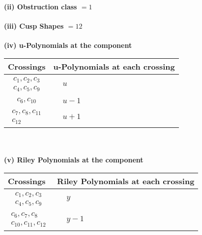 \documentclass[1p]{elsarticle_modified}
\theoremstyle{definition}
\begin{document}
\flushleft \textbf{(ii) Obstruction class $= 1$}\\~\\
\flushleft \textbf{(iii) Cusp Shapes $= 12$}\\~\\
\newpage\renewcommand{\arraystretch}{1}
\flushleft \textbf{(iv) u-Polynomials at the component}\newline \\
\begin{tabular}{m{50pt}|m{274pt}}
Crossings & \hspace{64pt}u-Polynomials at each crossing \\
\hline $$\begin{aligned}c_{1},c_{2},c_{3}\\c_{4},c_{5},c_{9}\end{aligned}$$&$\begin{aligned}
&u
\end{aligned}$\\
\hline $$\begin{aligned}c_{6},c_{10}\end{aligned}$$&$\begin{aligned}
&u-1
\end{aligned}$\\
\hline $$\begin{aligned}c_{7},c_{8},c_{11}\\c_{12}\end{aligned}$$&$\begin{aligned}
&u+1
\end{aligned}$\\
\hline
\end{tabular}\\~\\
\newpage\renewcommand{\arraystretch}{1}
\flushleft \textbf{(v) Riley Polynomials at the component}\newline \\
\begin{tabular}{m{50pt}|m{274pt}}
Crossings & \hspace{64pt}Riley Polynomials at each crossing \\
\hline $$\begin{aligned}c_{1},c_{2},c_{3}\\c_{4},c_{5},c_{9}\end{aligned}$$&$\begin{aligned}
&y
\end{aligned}$\\
\hline $$\begin{aligned}c_{6},c_{7},c_{8}\\c_{10},c_{11},c_{12}\end{aligned}$$&$\begin{aligned}
&y-1
\end{aligned}$\\
\hline
\end{tabular}\\~\\
\end{document}
